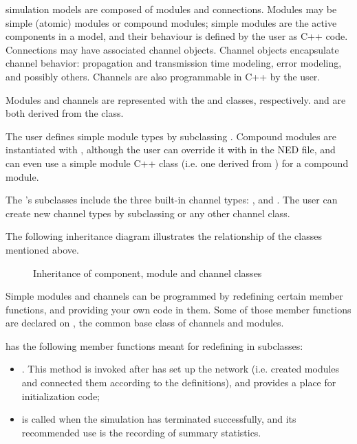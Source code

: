 {\opp} simulation models are composed of modules and connections. Modules
may be simple (atomic) modules or compound modules; simple modules are the
active components in a model, and their behaviour is defined by the user as
C++ code. Connections may have associated channel objects. Channel objects
encapsulate channel behavior: propagation and transmission time modeling,
error modeling, and possibly others. Channels are also programmable in C++
by the user.

Modules and channels are represented with the  and 
classes, respectively.  and  are both
derived from the  class.

The user defines simple module types by subclassing .
Compound modules are instantiated with , although
the user can override it with  in the NED file, and can even
use a simple module C++ class (i.e. one derived from )
for a compound module.

The 's subclasses include the three built-in channel
types: ,  and
. The user can create new channel types
by subclassing  or any other channel class.

The following inheritance diagram illustrates the relationship
of the classes mentioned above.

\begin{figure}[htbp]
  \begin{center}
    
    \caption{Inheritance of component, module and channel classes}
  \end{center}
\end{figure}

Simple modules and channels can be programmed by redefining certain
member functions, and providing your own code in them. Some of those
member functions are declared on , the common base
class of channels and modules.

 has the following member functions meant for
redefining in subclasses:

\begin{itemize}
  \item {}. This method is invoked after {\opp} has
    set up the network (i.e. created modules and connected them according
    to the definitions), and provides a place for initialization code;
  \item {} is called when the simulation has terminated
    successfully, and its recommended use is the recording of summary
    statistics.
\end{itemize}

